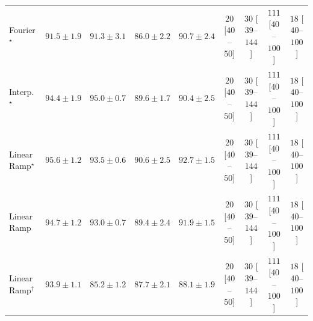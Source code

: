 \begin{tabular}{l|cccc|cccc|}
Fourier$^\star$ & {\cellcolor[HTML]{258745}} \color[HTML]{F1F1F1} $91.5\pm 1.9$ & {\cellcolor[HTML]{268846}} \color[HTML]{F1F1F1} $91.3\pm 3.1$ & {\cellcolor[HTML]{64BC6F}} \color[HTML]{F1F1F1} $86.0\pm 2.2$ & {\cellcolor[HTML]{2C8F4B}} \color[HTML]{F1F1F1} $90.7\pm 2.4$ & {\cellcolor[HTML]{FDE4E1}} \color[HTML]{000000} $20$ [$40$--$50$] & {\cellcolor[HTML]{FDD9D6}} \color[HTML]{000000} $30$ [$39$--$144$] & {\cellcolor[HTML]{E23E99}} \color[HTML]{F1F1F1} $111$ [$40$--$100$] & {\cellcolor[HTML]{FEE6E3}} \color[HTML]{000000} $18$ [$40$--$100$] \\
Interp.$^\star$ & {\cellcolor[HTML]{086E3A}} \color[HTML]{F1F1F1} $94.4\pm 1.9$ & {\cellcolor[HTML]{016937}} \color[HTML]{F1F1F1} $95.0\pm 0.7$ & {\cellcolor[HTML]{359C53}} \color[HTML]{F1F1F1} $89.6\pm 1.7$ & {\cellcolor[HTML]{2F934D}} \color[HTML]{F1F1F1} $90.4\pm 2.5$ & {\cellcolor[HTML]{FDE4E1}} \color[HTML]{000000} $20$ [$40$--$50$] & {\cellcolor[HTML]{FDD9D6}} \color[HTML]{000000} $30$ [$39$--$144$] & {\cellcolor[HTML]{E23E99}} \color[HTML]{F1F1F1} $111$ [$40$--$100$] & {\cellcolor[HTML]{FEE6E3}} \color[HTML]{000000} $18$ [$40$--$100$] \\
Linear Ramp$^\star$ & {\cellcolor[HTML]{006435}} \color[HTML]{F1F1F1} $95.6\pm 1.2$ & {\cellcolor[HTML]{11753D}} \color[HTML]{F1F1F1} $93.5\pm 0.6$ & {\cellcolor[HTML]{2D914B}} \color[HTML]{F1F1F1} $90.6\pm 2.5$ & {\cellcolor[HTML]{197C40}} \color[HTML]{F1F1F1} $92.7\pm 1.5$ & {\cellcolor[HTML]{FDE4E1}} \color[HTML]{000000} $20$ [$40$--$50$] & {\cellcolor[HTML]{FDD9D6}} \color[HTML]{000000} $30$ [$39$--$144$] & {\cellcolor[HTML]{E23E99}} \color[HTML]{F1F1F1} $111$ [$40$--$100$] & {\cellcolor[HTML]{FEE6E3}} \color[HTML]{000000} $18$ [$40$--$100$] \\
Linear Ramp & {\cellcolor[HTML]{056C39}} \color[HTML]{F1F1F1} $94.7\pm 1.2$ & {\cellcolor[HTML]{167A3F}} \color[HTML]{F1F1F1} $93.0\pm 0.7$ & {\cellcolor[HTML]{379E54}} \color[HTML]{F1F1F1} $89.4\pm 2.4$ & {\cellcolor[HTML]{218242}} \color[HTML]{F1F1F1} $91.9\pm 1.5$ & {\cellcolor[HTML]{FDE4E1}} \color[HTML]{000000} $20$ [$40$--$50$] & {\cellcolor[HTML]{FDD9D6}} \color[HTML]{000000} $30$ [$39$--$144$] & {\cellcolor[HTML]{E23E99}} \color[HTML]{F1F1F1} $111$ [$40$--$100$] & {\cellcolor[HTML]{FEE6E3}} \color[HTML]{000000} $18$ [$40$--$100$] \\
Linear Ramp$^\dagger$ & {\cellcolor[HTML]{0D733C}} \color[HTML]{F1F1F1} $93.9\pm 1.1$ & {\cellcolor[HTML]{70C275}} \color[HTML]{000000} $85.2\pm 1.2$ & {\cellcolor[HTML]{49AF61}} \color[HTML]{F1F1F1} $87.7\pm 2.1$ & {\cellcolor[HTML]{43AC5E}} \color[HTML]{F1F1F1} $88.1\pm 1.9$ & {\cellcolor[HTML]{FDE4E1}} \color[HTML]{000000} $20$ [$40$--$50$] & {\cellcolor[HTML]{FDD9D6}} \color[HTML]{000000} $30$ [$39$--$144$] & {\cellcolor[HTML]{E23E99}} \color[HTML]{F1F1F1} $111$ [$40$--$100$] & {\cellcolor[HTML]{FEE6E3}} \color[HTML]{000000} $18$ [$40$--$100$] \\

\end{tabular}
